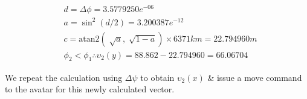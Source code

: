 \begin{align}
& d = \Delta{\phi} = 3.5779250e^{-06} \\ & a = \sin^{2}\left( d / 2 \right) = 3.200387e^{-12} \\ & c = \text{atan2} \left( \sqrt[]{a}, \sqrt[]{1-a} \right) \times 6371km = 22.794960m \\ & \phi_{2} < \phi_{1} \therefore \upsilon_{2}(y) = 88.862 - 22.794960 = 66.06704
\end{align}





					
					
					We repeat the calculation using $\Delta{\psi}$ to obtain $\upsilon_{2}(x)$ \& issue a move command to the avatar for this newly calculated vector.
					
					




